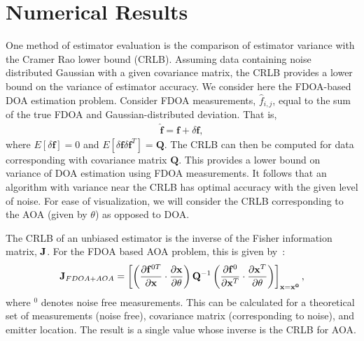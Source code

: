 \section{Numerical Results}
\label{s:numerics}

One method of estimator evaluation is the comparison of estimator variance with the Cramer Rao lower bound (CRLB). Assuming data containing noise distributed Gaussian with a given covariance matrix, the CRLB provides a lower bound on the variance of estimator accuracy. We consider here the FDOA-based DOA estimation problem. Consider FDOA measurements, $\hat{f}_{i,j}$, equal to the sum of the true FDOA and Gaussian-distributed deviation. That is,
\begin{align*}
\hat{\mathbf{f}} = \mathbf{f} + \delta \mathbf{f},
\end{align*}
where $E\left[\delta \mathbf{f}\right]=0$ and $E\left[\delta\mathbf{f}\delta\mathbf{f}^T\right]=\mathbf{Q}$. The CRLB can then be computed for data corresponding with covariance matrix $\mathbf{Q}$. This provides a lower bound on variance of DOA estimation using FDOA measurements. It follows that an algorithm with variance near the CRLB has optimal accuracy with the given level of noise. For ease of visualization, we will consider the CRLB corresponding to the AOA (given by $\theta$) as opposed to DOA.

The CRLB of an unbiased estimator is the inverse of the Fisher information matrix, $\mathbf{J}$. For the FDOA based AOA problem, this is given by~\cite{Ho1997}:
\begin{align*}
\mathbf{J}_{FDOA+AOA} = \left[\left(\frac{\partial\mathbf{f}^{0T}}{\partial\mathbf{x}}\cdot\frac{\partial\mathbf{x}}{\partial\theta}\right)\mathbf{Q}^{-1}\left(\frac{\partial \mathbf{f}^0}{\partial\mathbf{x}^T}\cdot\frac{\partial\mathbf{x}^T}{\partial\theta}\right)\right]_{\mathbf{x=x^0}},
\end{align*}
where $^0$ denotes noise free measurements. This can be calculated for a theoretical set of measurements (noise free), covariance matrix (corresponding to noise), and emitter location. The result is a single value whose inverse is the CRLB for AOA.

